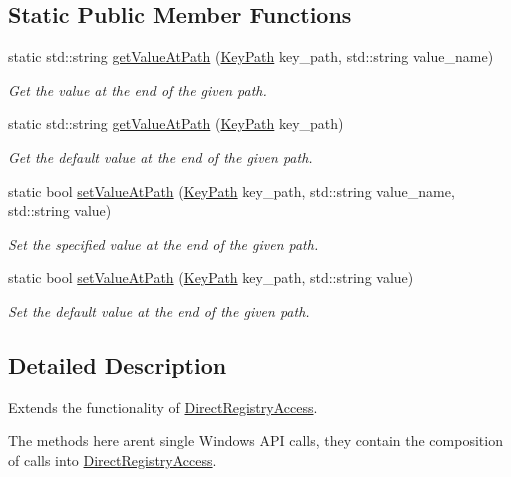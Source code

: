 \subsection*{Static Public Member Functions}
\begin{DoxyCompactItemize}
\item 
static std\+::string \hyperlink{class_simple_registry_access_accef2c679695c6e05a9e7c1c2a962481}{get\+Value\+At\+Path} (\hyperlink{class_key_path}{Key\+Path} key\+\_\+path, std\+::string value\+\_\+name)
\begin{DoxyCompactList}\small\item\em Get the value at the end of the given path. \end{DoxyCompactList}\item 
static std\+::string \hyperlink{class_simple_registry_access_afb4986051b99ff89e156a2ab6b89aca3}{get\+Value\+At\+Path} (\hyperlink{class_key_path}{Key\+Path} key\+\_\+path)
\begin{DoxyCompactList}\small\item\em Get the default value at the end of the given path. \end{DoxyCompactList}\item 
static bool \hyperlink{class_simple_registry_access_a75e85e4de87a14c50a81b3cd080a2a97}{set\+Value\+At\+Path} (\hyperlink{class_key_path}{Key\+Path} key\+\_\+path, std\+::string value\+\_\+name, std\+::string value)
\begin{DoxyCompactList}\small\item\em Set the specified value at the end of the given path. \end{DoxyCompactList}\item 
static bool \hyperlink{class_simple_registry_access_aea8420eb295c6c9e11093b1928a8591c}{set\+Value\+At\+Path} (\hyperlink{class_key_path}{Key\+Path} key\+\_\+path, std\+::string value)
\begin{DoxyCompactList}\small\item\em Set the default value at the end of the given path. \end{DoxyCompactList}\end{DoxyCompactItemize}


\subsection{Detailed Description}
Extends the functionality of \hyperlink{class_direct_registry_access}{Direct\+Registry\+Access}. 

The methods here aren\textquotesingle{}t single Windows A\+P\+I calls, they contain the composition of calls into \hyperlink{class_direct_registry_access}{Direct\+Registry\+Access}.


